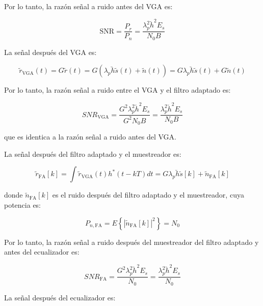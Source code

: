 \documentclass[11pt]{article}
\begin{document}
Por lo tanto, la razón señal a ruido antes del VGA es:

\begin{equation*}
    \text{SNR} = \frac{P_{r}}{P_{n}} = \frac{\lambda_p^2 \breve{h}^2 E_s}{N_0 B}
\end{equation*}


La señal después del VGA es:

\begin{equation*}
    \tilde{r}_{\text{VGA}}(t) = G \tilde{r}(t) = G (\lambda_p \breve{h} \tilde{s}(t) + \tilde{n}(t)) = G \lambda_p \breve{h} \tilde{s}(t) + G \tilde{n}(t)
\end{equation*}

Por lo tanto, la razón señal a ruido entre el VGA y el filtro adaptado es:

\[
SNR_{\text{VGA}} = \frac{G^2 \lambda_p^2 \breve{h}^2 E_s}{G^2 N_0 B} = \frac{\lambda_p^2 \breve{h}^2 E_s}{N_0 B}
\]

que es identica a la razón señal a ruido antes del VGA.


La señal después del filtro adaptado y el muestreador es:

\begin{equation*}
    \tilde{r}_{\text{FA}}[k] = \int \tilde{r}_{\text{VGA}}(t) h^*(t - kT) dt = G \lambda_p \breve{h} \tilde{s}[k] + \tilde{n}_{\text{FA}}[k]
\end{equation*}

donde \(\tilde{n}_{\text{FA}}[k]\) es el ruido después del filtro adaptado y el muestreador, cuya potencia es:

\begin{equation*}
    P_{n, \text{FA}} = E\left\{|\tilde{n}_{\text{FA}}[k]|^2\right\} = N_0
\end{equation*}

Por lo tanto, la razón señal a ruido después del muestreador del filtro adaptado y antes del ecualizador es:

\begin{equation*}
    SNR_{\text{FA}} = \frac{G^2 \lambda_p^2 \breve{h}^2 E_s}{N_0} = \frac{\lambda_p^2 \breve{h}^2 E_s}{N_0}
\end{equation*}


La señal después del ecualizador es:
\end{document}
